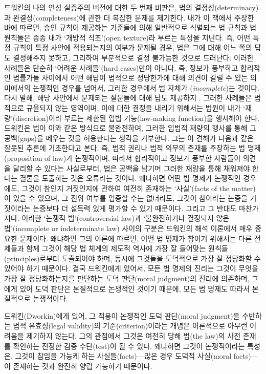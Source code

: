드워킨의 나의 연성 실증주의 버전에 대한 두 번째 비판은, 법의
결정성(determinacy)과 완결성(completeness)에 관한 더 복잡한 문제를
제기한다. 내가 이 책에서 주장한 바에 따르면, 승인 규칙이 제공하는
기준들에 의해 일반적으로 식별되는 법 규칙과 법 원칙들은 종종 내가
`개방적 직조'(open texture)라 부르는 특성을 지닌다. 즉, 어떤 특정 규칙이
특정 사안에 적용되는지의 여부가 문제될 경우, 법은 그에 대해 어느 쪽의
답도 결정해주지 못하고, 그리하여 부분적으로 결정 불가능한 것으로
드러난다. 이러한 사례들은 단순히 `어려운 사례들'(hard cases)만이 아니다.
즉, 정보가 풍부하고 합리적인 법률가들 사이에서 어떤 해답이 법적으로
정당한가에 대해 의견이 갈릴 수 있는 의미에서의 논쟁적인 경우를 넘어서,
그러한 경우에서 법 자체가 (\emph{incomplete})는 것이다.
다시 말해, 해당 사안에서 문제되는 질문들에 대해  답도
제공하지 . 그러한 사례들은 법적으로 규율되지 않는 영역이며,
이에 대한 결정을 내리기 위해서는 법원이 내가 `재량'(discretion)이라
부르는 제한된 입법 기능(law-making function)을 행사해야 한다. 드워킨은
법이 이와 같은 방식으로 불완전하며, 그러한 입법적 재량의 행사를 통해 그
공백(gaps)을 메우는 것을 허용한다는 생각을 거부한다. 그는 이 견해가
다음과 같은 잘못된 추론에 기초한다고 본다. 즉, 법적 권리나 법적 의무의
존재를 주장하는 법 명제(proposition of law)가 논쟁적이며, 따라서
합리적이고 정보가 풍부한 사람들이 의견을 달리할 수 있다는 사실로부터,
법은 공백을 남기며 그러한 재량을 통해 채워져야 한다는 결론을 도출하는
것은 오류라는 것이다. 왜냐하면 어떤 법 명제가 논쟁적인 경우에도, 그것이
참인지 거짓인지에 관하여 여전히 존재하는 `사실'(facts of the matter)이
있을 수 있으며, 그 진위 여부를 입증할 수는 없더라도, 그것이 참이라는
논증을 거짓이라는 논증보다 더 설득력 있게 평가할 수 있기 때문이다.
그리고 그 반대도 마찬가지다. 이러한 `논쟁적 법'(controversial law)과
`불완전하거나 결정되지 않은 법'(incomplete or indeterminate law) 사이의
구분은 드워킨의 해석 이론에서 매우 중요한 문제이다. 왜냐하면 그의 이론에
따르면, 어떤 법 명제가 참이기 위해서는 다른 전제들과 함께 그것이 해당 법
체계의 제도적 역사에 가장 잘 들어맞는 원칙들(principles)로부터
도출되어야 하며, 동시에 그것들을 도덕적으로 가장 잘 정당화할 수 있어야
하기 때문이다. 결국 드워킨에게 있어서, 모든 법 명제의 진리는 그것이
무엇을 가장 잘 정당화하는지를 판단하는 도덕 판단(moral judgment)의
진리에 의존하며, 그에게 있어 도덕 판단은 본질적으로 논쟁적인 것이기
때문에, 모든 법 명제도 따라서 본질적으로 논쟁적이다.

드워킨(Dworkin)에게 있어, 그 적용이 논쟁적인 도덕 판단(moral judgment)을
수반하는 법적 유효성(legal validity)의 기준(criterion)이라는 개념은
이론적으로 아무런 어려움을 제기하지 않는다. 그의 관점에서 그것은 여전히
당해 법(the law)의 사전 존재를 확인하는 진정한 검증 수단(test)이 될 수
있다. 왜냐하면 그것이 논쟁적이라는 특성은, 그것이 참임을 가능케 하는
사실들(facts)---많은 경우 도덕적 사실(moral facts)---이 존재하는 것과
완전히 양립 가능하기 때문이다.


